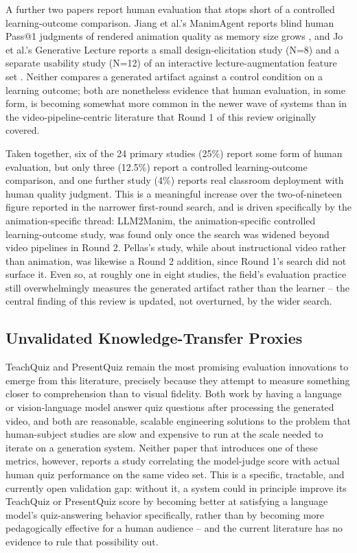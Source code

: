 \documentclass[journal]{IEEEtran}
\begin{document}
A further two papers report human evaluation that stops short of a controlled learning-outcome comparison. Jiang et al.'s ManimAgent reports blind human Pass@1 judgments of rendered animation quality as memory size grows \cite{jiang2026manimagent}, and Jo et al.'s Generative Lecture reports a small design-elicitation study (N=8) and a separate usability study (N=12) of an interactive lecture-augmentation feature set \cite{jo2025generativelecture}. Neither compares a generated artifact against a control condition on a learning outcome; both are nonetheless evidence that human evaluation, in some form, is becoming somewhat more common in the newer wave of systems than in the video-pipeline-centric literature that Round 1 of this review originally covered.

Taken together, six of the 24 primary studies (25\%) report some form of human evaluation, but only three (12.5\%) report a controlled learning-outcome comparison, and one further study (4\%) reports real classroom deployment with human quality judgment. This is a meaningful increase over the two-of-nineteen figure reported in the narrower first-round search, and is driven specifically by the animation-specific thread: LLM2Manim, the animation-specific controlled learning-outcome study, was found only once the search was widened beyond video pipelines in Round 2. Pellas's study, while about instructional video rather than animation, was likewise a Round 2 addition, since Round 1's search did not surface it. Even so, at roughly one in eight studies, the field's evaluation practice still overwhelmingly measures the generated artifact rather than the learner -- the central finding of this review is updated, not overturned, by the wider search.

\subsection{Unvalidated Knowledge-Transfer Proxies}

TeachQuiz and PresentQuiz remain the most promising evaluation innovations to emerge from this literature, precisely because they attempt to measure something closer to comprehension than to visual fidelity. Both work by having a language or vision-language model answer quiz questions after processing the generated video, and both are reasonable, scalable engineering solutions to the problem that human-subject studies are slow and expensive to run at the scale needed to iterate on a generation system. Neither paper that introduces one of these metrics, however, reports a study correlating the model-judge score with actual human quiz performance on the same video set. This is a specific, tractable, and currently open validation gap: without it, a system could in principle improve its TeachQuiz or PresentQuiz score by becoming better at satisfying a language model's quiz-answering behavior specifically, rather than by becoming more pedagogically effective for a human audience -- and the current literature has no evidence to rule that possibility out.
\end{document}
